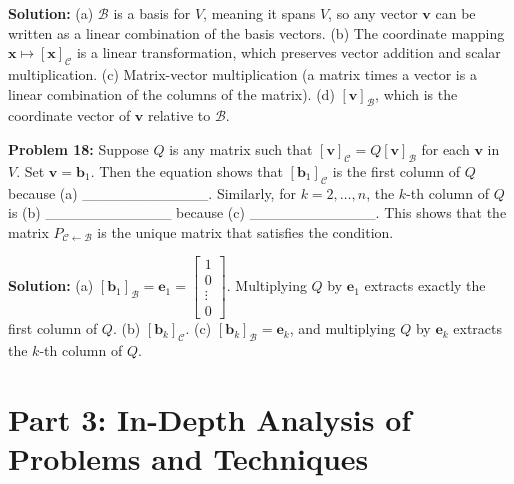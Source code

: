 \documentclass[11pt]{article}
\begin{document}
\textbf{Solution:}
(a) $\mathcal{B}$ is a basis for $V$, meaning it spans $V$, so any vector $\mathbf{v}$ can be written as a linear combination of the basis vectors.
(b) The coordinate mapping $\mathbf{x} \mapsto [\mathbf{x}]_{\mathcal{C}}$ is a linear transformation, which preserves vector addition and scalar multiplication.
(c) Matrix-vector multiplication (a matrix times a vector is a linear combination of the columns of the matrix).
(d) $[\mathbf{v}]_{\mathcal{B}}$, which is the coordinate vector of $\mathbf{v}$ relative to $\mathcal{B}$.

\textbf{Problem 18:} Suppose $Q$ is any matrix such that $[\mathbf{v}]_{\mathcal{C}} = Q[\mathbf{v}]_{\mathcal{B}}$ for each $\mathbf{v}$ in $V$. Set $\mathbf{v} = \mathbf{b}_1$. Then the equation shows that $[\mathbf{b}_1]_{\mathcal{C}}$ is the first column of $Q$ because (a) \_\_\_\_\_\_\_\_\_\_\_\_. Similarly, for $k = 2, \dots, n$, the $k$-th column of $Q$ is (b) \_\_\_\_\_\_\_\_\_\_\_\_ because (c) \_\_\_\_\_\_\_\_\_\_\_\_. This shows that the matrix $P_{\mathcal{C} \leftarrow \mathcal{B}}$ is the unique matrix that satisfies the condition.

\textbf{Solution:}
(a) $[\mathbf{b}_1]_{\mathcal{B}} = \mathbf{e}_1 = \begin{bmatrix} 1 \\ 0 \\ \vdots \\ 0 \end{bmatrix}$. Multiplying $Q$ by $\mathbf{e}_1$ extracts exactly the first column of $Q$.
(b) $[\mathbf{b}_k]_{\mathcal{C}}$.
(c) $[\mathbf{b}_k]_{\mathcal{B}} = \mathbf{e}_k$, and multiplying $Q$ by $\mathbf{e}_k$ extracts the $k$-th column of $Q$.

\section{Part 3: In-Depth Analysis of Problems and Techniques}
\end{document}
